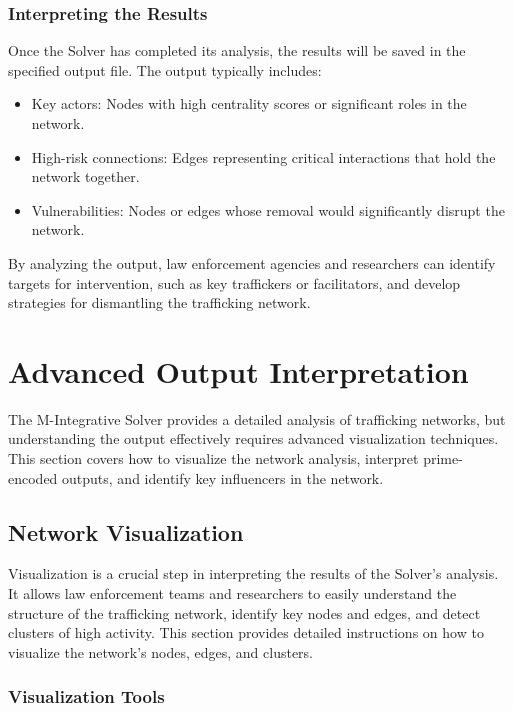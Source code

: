 \documentclass[%
 preprint, linenumbers,
 amsmath,amssymb,
 aps, physrev,
]{revtex4-2}
\begin{document}
\subsubsection{Interpreting the Results}

Once the Solver has completed its analysis, the results will be saved in the specified output file. The output typically includes:
\begin{itemize}
    \item Key actors: Nodes with high centrality scores or significant roles in the network.
    \item High-risk connections: Edges representing critical interactions that hold the network together.
    \item Vulnerabilities: Nodes or edges whose removal would significantly disrupt the network.
\end{itemize}

By analyzing the output, law enforcement agencies and researchers can identify targets for intervention, such as key traffickers or facilitators, and develop strategies for dismantling the trafficking network.

\section{Advanced Output Interpretation}

The M-Integrative Solver provides a detailed analysis of trafficking networks, but understanding the output effectively requires advanced visualization techniques. This section covers how to visualize the network analysis, interpret prime-encoded outputs, and identify key influencers in the network.

\subsection{Network Visualization}

Visualization is a crucial step in interpreting the results of the Solver’s analysis. It allows law enforcement teams and researchers to easily understand the structure of the trafficking network, identify key nodes and edges, and detect clusters of high activity. This section provides detailed instructions on how to visualize the network’s nodes, edges, and clusters.

\subsubsection{Visualization Tools}
\end{document}
